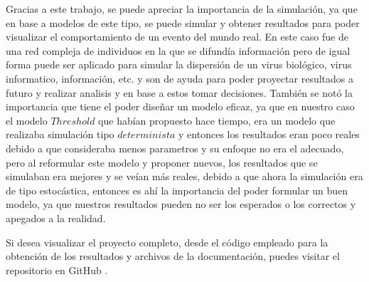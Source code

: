 \documentclass{article}
\begin{document}
	Gracias a este trabajo, se puede apreciar la importancia de la simulación, ya que en base a modelos de este tipo, se puede simular y obtener resultados para poder visualizar el comportamiento de un evento del mundo real. En este caso fue de una red compleja de individuos en la que se difundía información pero de igual forma puede ser aplicado para simular la dispersión de un virus biológico, virus informatico, información, etc. y son de ayuda para poder proyectar resultados a futuro y realizar analisis y en base a estos tomar decisiones. También se notó la importancia que tiene el poder diseñar un modelo eficaz, ya que en nuestro caso el modelo $Threshold$ que habían propuesto hace tiempo, era un modelo que realizaba simulación tipo $determinista$ y entonces los resultados eran poco reales debido a que consideraba menos parametros y su enfoque no era el adecuado, pero al reformular este modelo y proponer nuevos, los resultados que se simulaban era mejores y se veían más reales, debido a que ahora la simulación era de tipo estocástica, entonces es ahí la importancia del poder formular un buen modelo, ya que nuestros resultados pueden no ser los esperados o los correctos y apegados a la realidad.
	
	Si desea visualizar el proyecto completo, desde el código empleado para la obtención de los resultados y archivos de la documentación, puedes visitar el repositorio en GitHub \cites{git:2020}{Garcia}. 
\newpage

\printbibliography
\end{document}
